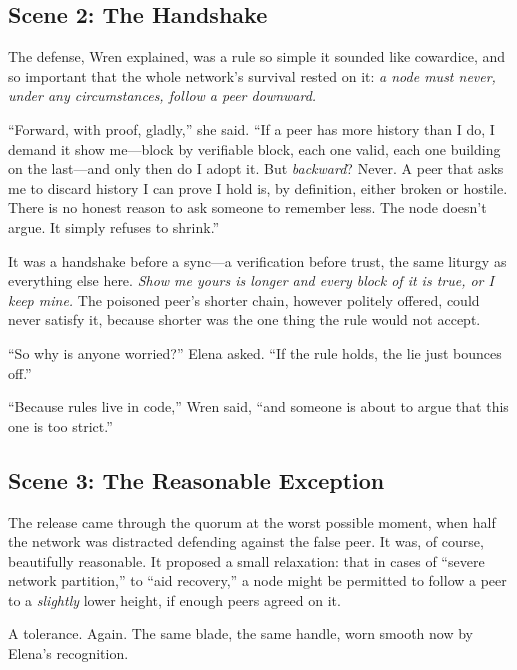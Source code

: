 \documentclass[12pt,letterpaper]{book}
\begin{document}
\hypertarget{scene-2-the-handshake}{%
\subsection{Scene 2: The
Handshake}\label{scene-2-the-handshake}}

The defense, Wren explained, was a rule so simple it sounded like cowardice, and
so important that the whole network's survival rested on it: \emph{a node must
never, under any circumstances, follow a peer downward.}

``Forward, with proof, gladly,'' she said. ``If a peer has more history than I do,
I demand it show me---block by verifiable block, each one valid, each one building
on the last---and only then do I adopt it. But \emph{backward}? Never. A peer that
asks me to discard history I can prove I hold is, by definition, either broken or
hostile. There is no honest reason to ask someone to remember less. The node
doesn't argue. It simply refuses to shrink.''

It was a handshake before a sync---a verification before trust, the same liturgy
as everything else here. \emph{Show me yours is longer and every block of it is
true, or I keep mine.} The poisoned peer's shorter chain, however politely
offered, could never satisfy it, because shorter was the one thing the rule would
not accept.

``So why is anyone worried?'' Elena asked. ``If the rule holds, the lie just
bounces off.''

``Because rules live in code,'' Wren said, ``and someone is about to argue that
this one is too strict.''

\hypertarget{scene-3-the-reasonable-exception}{%
\subsection{Scene 3: The Reasonable
Exception}\label{scene-3-the-reasonable-exception}}

The release came through the quorum at the worst possible moment, when half the
network was distracted defending against the false peer. It was, of course,
beautifully reasonable. It proposed a small relaxation: that in cases of
``severe network partition,'' to ``aid recovery,'' a node might be permitted to
follow a peer to a \emph{slightly} lower height, if enough peers agreed on it.

A tolerance. Again. The same blade, the same handle, worn smooth now by Elena's
recognition.
\end{document}
